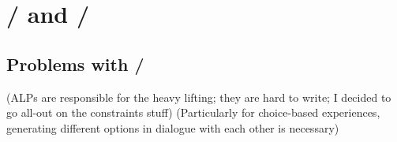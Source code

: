\chapter{\minstrel/ and \skald/}

\label{ch:skald}

\section{Problems with \problemplanets/}

\label{sct:problem-planets-problems}

(ALPs are responsible for the heavy lifting; they are hard to write; I decided to go all-out on the constraints stuff)
(Particularly for choice-based experiences, generating different options in dialogue with each other is necessary)
